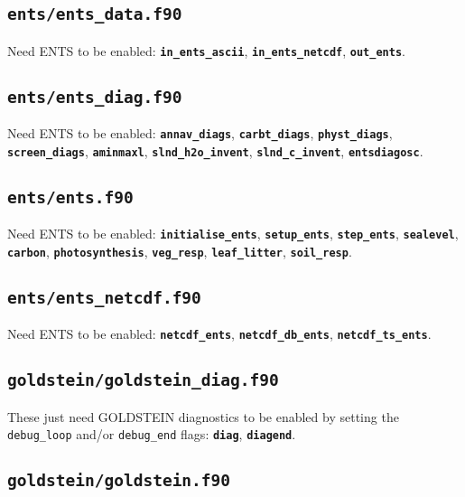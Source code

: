 \documentclass[a4paper,10pt,article]{memoir}
\begin{document}
\subsection*{\texttt{ents/ents\_data.f90}}

Need ENTS to be enabled: \textbf{\texttt{in\_ents\_ascii}},
\textbf{\texttt{in\_ents\_netcdf}}, \textbf{\texttt{out\_ents}}.


\subsection*{\texttt{ents/ents\_diag.f90}}

Need ENTS to be enabled: \textbf{\texttt{annav\_diags}},
\textbf{\texttt{carbt\_diags}}, \textbf{\texttt{physt\_diags}},
\textbf{\texttt{screen\_diags}}, \textbf{\texttt{aminmaxl}},
\textbf{\texttt{slnd\_h2o\_invent}},
\textbf{\texttt{slnd\_c\_invent}}, \textbf{\texttt{entsdiagosc}}.


\subsection*{\texttt{ents/ents.f90}}

Need ENTS to be enabled: \textbf{\texttt{initialise\_ents}},
\textbf{\texttt{setup\_ents}}, \textbf{\texttt{step\_ents}},
\textbf{\texttt{sealevel}}, \textbf{\texttt{carbon}},
\textbf{\texttt{photosynthesis}}, \textbf{\texttt{veg\_resp}},
\textbf{\texttt{leaf\_litter}}, \textbf{\texttt{soil\_resp}}.


\subsection*{\texttt{ents/ents\_netcdf.f90}}

Need ENTS to be enabled: \textbf{\texttt{netcdf\_ents}},
\textbf{\texttt{netcdf\_db\_ents}},
\textbf{\texttt{netcdf\_ts\_ents}}.


\subsection*{\texttt{goldstein/goldstein\_diag.f90}}

These just need GOLDSTEIN diagnostics to be enabled by setting the
\texttt{debug\_loop} and/or \texttt{debug\_end} flags:
\textbf{\texttt{diag}}, \textbf{\texttt{diagend}}.


\subsection*{\texttt{goldstein/goldstein.f90}}
\end{document}
